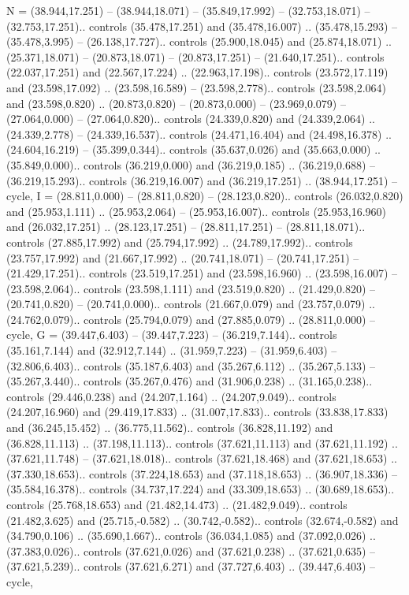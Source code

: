 {N} = {(38.944,17.251) -- (38.944,18.071) -- (35.849,17.992) -- (32.753,18.071) -- (32.753,17.251).. controls (35.478,17.251) and (35.478,16.007) .. (35.478,15.293) -- (35.478,3.995) -- (26.138,17.727).. controls (25.900,18.045) and (25.874,18.071) .. (25.371,18.071) -- (20.873,18.071) -- (20.873,17.251) -- (21.640,17.251).. controls (22.037,17.251) and (22.567,17.224) .. (22.963,17.198).. controls (23.572,17.119) and (23.598,17.092) .. (23.598,16.589) -- (23.598,2.778).. controls (23.598,2.064) and (23.598,0.820) .. (20.873,0.820) -- (20.873,0.000) -- (23.969,0.079) -- (27.064,0.000) -- (27.064,0.820).. controls (24.339,0.820) and (24.339,2.064) .. (24.339,2.778) -- (24.339,16.537).. controls (24.471,16.404) and (24.498,16.378) .. (24.604,16.219) -- (35.399,0.344).. controls (35.637,0.026) and (35.663,0.000) .. (35.849,0.000).. controls (36.219,0.000) and (36.219,0.185) .. (36.219,0.688) -- (36.219,15.293).. controls (36.219,16.007) and (36.219,17.251) .. (38.944,17.251) -- cycle},
{I} = {(28.811,0.000) -- (28.811,0.820) -- (28.123,0.820).. controls (26.032,0.820) and (25.953,1.111) .. (25.953,2.064) -- (25.953,16.007).. controls (25.953,16.960) and (26.032,17.251) .. (28.123,17.251) -- (28.811,17.251) -- (28.811,18.071).. controls (27.885,17.992) and (25.794,17.992) .. (24.789,17.992).. controls (23.757,17.992) and (21.667,17.992) .. (20.741,18.071) -- (20.741,17.251) -- (21.429,17.251).. controls (23.519,17.251) and (23.598,16.960) .. (23.598,16.007) -- (23.598,2.064).. controls (23.598,1.111) and (23.519,0.820) .. (21.429,0.820) -- (20.741,0.820) -- (20.741,0.000).. controls (21.667,0.079) and (23.757,0.079) .. (24.762,0.079).. controls (25.794,0.079) and (27.885,0.079) .. (28.811,0.000) -- cycle},
{G} = {(39.447,6.403) -- (39.447,7.223) -- (36.219,7.144).. controls (35.161,7.144) and (32.912,7.144) .. (31.959,7.223) -- (31.959,6.403) -- (32.806,6.403).. controls (35.187,6.403) and (35.267,6.112) .. (35.267,5.133) -- (35.267,3.440).. controls (35.267,0.476) and (31.906,0.238) .. (31.165,0.238).. controls (29.446,0.238) and (24.207,1.164) .. (24.207,9.049).. controls (24.207,16.960) and (29.419,17.833) .. (31.007,17.833).. controls (33.838,17.833) and (36.245,15.452) .. (36.775,11.562).. controls (36.828,11.192) and (36.828,11.113) .. (37.198,11.113).. controls (37.621,11.113) and (37.621,11.192) .. (37.621,11.748) -- (37.621,18.018).. controls (37.621,18.468) and (37.621,18.653) .. (37.330,18.653).. controls (37.224,18.653) and (37.118,18.653) .. (36.907,18.336) -- (35.584,16.378).. controls (34.737,17.224) and (33.309,18.653) .. (30.689,18.653).. controls (25.768,18.653) and (21.482,14.473) .. (21.482,9.049).. controls (21.482,3.625) and (25.715,-0.582) .. (30.742,-0.582).. controls (32.674,-0.582) and (34.790,0.106) .. (35.690,1.667).. controls (36.034,1.085) and (37.092,0.026) .. (37.383,0.026).. controls (37.621,0.026) and (37.621,0.238) .. (37.621,0.635) -- (37.621,5.239).. controls (37.621,6.271) and (37.727,6.403) .. (39.447,6.403) -- cycle},
